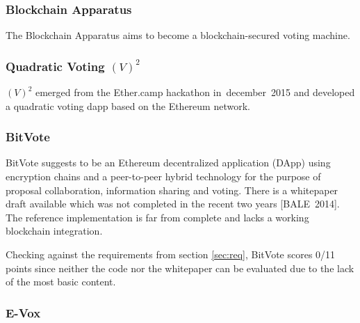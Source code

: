\documentclass[9pt,oneside]{amsart}
\begin{document}
\begin{multicols}{2}
\subsubsection{Blockchain Apparatus}
The Blockchain Apparatus aims to become a blockchain-secured voting machine.

\subsubsection{Quadratic Voting $(V)^2$}
$(V)^2$ emerged from the Ether.camp hackathon in~december~2015 and developed a quadratic voting dapp based on the Ethereum network.


\subsubsection{BitVote}
BitVote suggests to be an Ethereum decentralized application (DApp) using encryption chains and a peer-to-peer hybrid technology for the purpose of proposal collaboration, information sharing and voting. There is a whitepaper draft available which was not completed in the recent two years [BALE~2014]. The reference implementation is far from complete and lacks a working blockchain integration.\par
Checking against the requirements from section \ref{sec:req}, BitVote scores 0/11 points since neither the code nor the whitepaper can be evaluated due to the lack of the most basic content.


\subsubsection{E-Vox}


\end{multicols}
\end{document}
